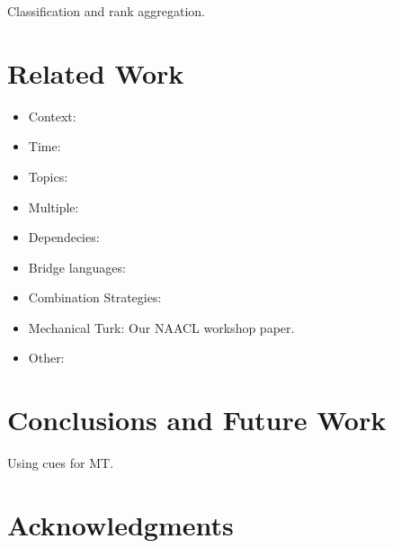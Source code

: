 \documentclass[11pt]{article}
\begin{document}
Classification and rank aggregation.

\section{Related Work} \label{sect:relwork}

\begin{itemize}
\setlength{\parskip}{0pt}
  \item Context: \cite{Rapp:1995,Rapp:1999,Fung:1998}
  \item Time: \cite{Schafer:2002,Klementiev:2006b}
  \item Topics: \cite{Mimno:2009,Boyd-Graber:2009}
  \item Multiple: \cite{Schafer:2002,Koehn:2000,Haghighi:2008}
  \item Dependecies: \cite{Garera:2009}
  \item Bridge languages: \cite{Mann:2001}
  \item Combination Strategies: \cite{Koehn:2000,Klementiev:2006b,Klementiev:2008a}
  \item Mechanical Turk: Our NAACL workshop paper.
  \item Other: \cite{Monz:2005}
\end{itemize}

\section{Conclusions and Future Work} \label{sect:conclusions}

Using cues for MT.

\section*{Acknowledgments}



\end{document}
